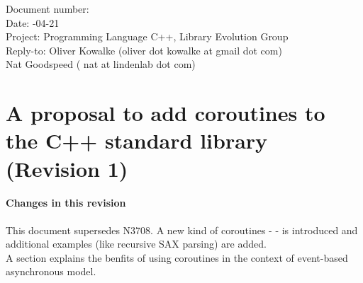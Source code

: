 \documentclass[a4paper,10pt,DIV15]{scrartcl}
\begin{document}
\small
\begin{tabbing}
    Document number: \=  \\
    Date:            -04-21 \\
    Project:         \> Programming Language C++, Library Evolution Group\\
    Reply-to:        \> Oliver Kowalke (oliver dot kowalke at gmail dot com)\\
                     \> Nat Goodspeed ( nat at lindenlab dot com)\\
\end{tabbing}

\section*{A proposal to add coroutines to the C++ standard library (Revision 1)}


\tableofcontents


\paragraph*{Changes in this revision}
This document supersedes N3708. A new kind of coroutines - \scoro - is introduced
and additional examples (like recursive SAX parsing) are added.\\
A section explains the benfits of using coroutines in the context of event-based
asynchronous model.













\end{document}

